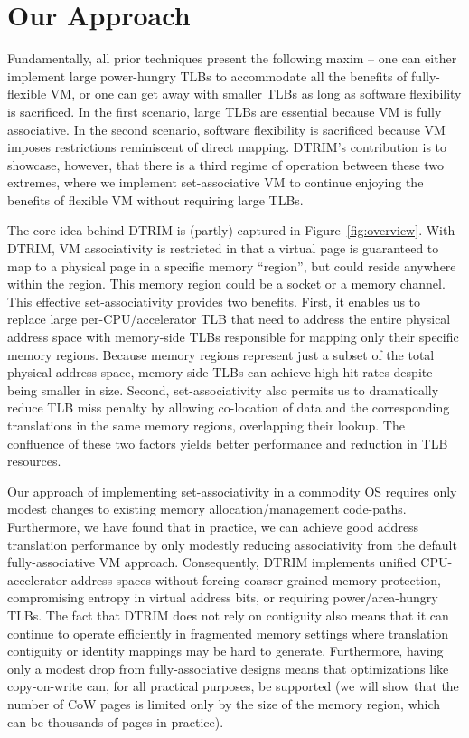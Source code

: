 \section{Our Approach}
\label{our-approach}
Fundamentally, all prior techniques present the following maxim -- one
can either implement large power-hungry TLBs to accommodate all the
benefits of fully-flexible VM, or one can get away with smaller TLBs
as long as software flexibility is sacrificed. In the first scenario,
large TLBs are essential because VM is fully associative. In the
second scenario, software flexibility is sacrificed because VM imposes
restrictions reminiscent of direct mapping. DTRIM's contribution is
to showcase, however, that there is a third regime of operation
between these two extremes, where we implement set-associative VM to
continue enjoying the benefits of flexible VM without requiring large
TLBs. 

The core idea behind DTRIM is (partly) captured in
Figure~\ref{fig:overview}. With DTRIM, VM associativity is restricted
in that a virtual page is guaranteed to map to a physical page in a
specific memory ``region'', but could reside anywhere within the
region. This memory region could be a socket or a memory channel. This
effective set-associativity provides two benefits. First, it enables
us to replace large per-CPU/accelerator TLB that need to address the
entire physical address space with memory-side TLBs responsible for
mapping only their specific memory regions. Because memory regions
represent just a subset of the total physical address space,
memory-side TLBs can achieve high hit rates despite being smaller in
size. Second, set-associativity also permits us to dramatically reduce
TLB miss penalty by allowing co-location of data and the corresponding
translations in the same memory regions, overlapping their lookup. The
confluence of these two factors yields better performance and
reduction in TLB resources.

Our approach of implementing set-associativity in a commodity OS
requires only modest changes to existing memory allocation/management
code-paths. Furthermore, we have found that in practice, we can
achieve good address translation performance by only modestly reducing
associativity from the default fully-associative VM
approach. Consequently, DTRIM implements unified CPU-accelerator
address spaces without forcing coarser-grained memory protection,
compromising entropy in virtual address bits, or requiring
power/area-hungry TLBs. The fact that DTRIM does not rely on
contiguity also means that it can continue to operate efficiently in
fragmented memory settings where translation contiguity or identity
mappings may be hard to generate. Furthermore, having only a modest
drop from fully-associative designs means that optimizations like
copy-on-write can, for all practical purposes, be supported (we will
show that the number of CoW pages is limited only by the size of the
memory region, which can be thousands of pages in practice).


